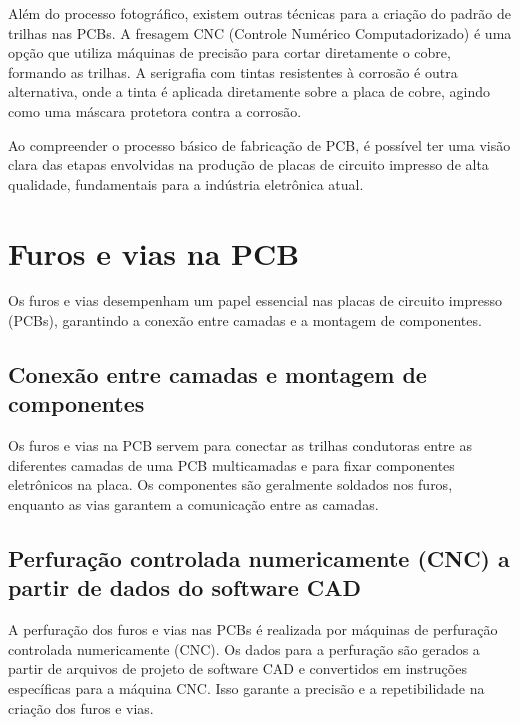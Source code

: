 Além do processo fotográfico, existem outras técnicas para a criação do padrão de trilhas nas PCBs. A fresagem CNC (Controle Numérico Computadorizado) é uma opção que utiliza máquinas de precisão para cortar diretamente o cobre, formando as trilhas. A serigrafia com tintas resistentes à corrosão é outra alternativa, onde a tinta é aplicada diretamente sobre a placa de cobre, agindo como uma máscara protetora contra a corrosão.

Ao compreender o processo básico de fabricação de PCB, é possível ter uma visão clara das etapas envolvidas na produção de placas de circuito impresso de alta qualidade, fundamentais para a indústria eletrônica atual.

\hypertarget{furos-e-vias-na-pcb}{%
\section{Furos e vias na PCB}\label{furos-e-vias-na-pcb}}

Os furos e vias desempenham um papel essencial nas placas de circuito impresso (PCBs), garantindo a conexão entre camadas e a montagem de componentes.

\hypertarget{conexuxe3o-entre-camadas-e-montagem-de-componentes}{%
\subsection{Conexão entre camadas e montagem de componentes}\label{conexuxe3o-entre-camadas-e-montagem-de-componentes}}

Os furos e vias na PCB servem para conectar as trilhas condutoras entre as diferentes camadas de uma PCB multicamadas e para fixar componentes eletrônicos na placa. Os componentes são geralmente soldados nos furos, enquanto as vias garantem a comunicação entre as camadas.

\hypertarget{perfurauxe7uxe3o-controlada-numericamente-cnc-a-partir-de-dados-do-software-cad}{%
\subsection{Perfuração controlada numericamente (CNC) a partir de dados do software CAD}\label{perfurauxe7uxe3o-controlada-numericamente-cnc-a-partir-de-dados-do-software-cad}}

A perfuração dos furos e vias nas PCBs é realizada por máquinas de perfuração controlada numericamente (CNC). Os dados para a perfuração são gerados a partir de arquivos de projeto de software CAD e convertidos em instruções específicas para a máquina CNC. Isso garante a precisão e a repetibilidade na criação dos furos e vias.

